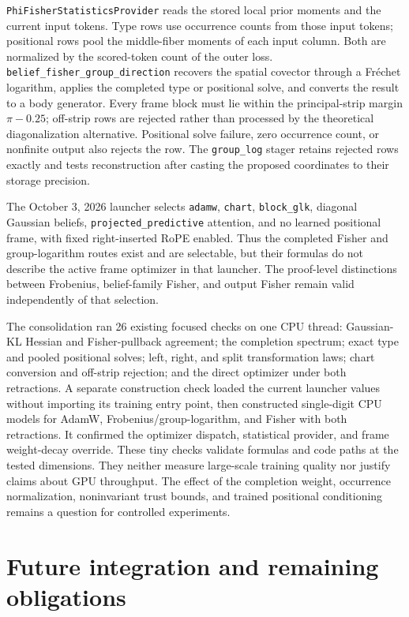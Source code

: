 \documentclass[11pt]{article}
\theoremstyle{definition}
\theoremstyle{remark}
\begin{document}
\texttt{PhiFisherStatisticsProvider} reads the stored local prior moments and the current input tokens. Type rows use occurrence counts from those input tokens; positional rows pool the middle-fiber moments of each input column. Both are normalized by the scored-token count of the outer loss. \texttt{belief\_fisher\_group\_direction} recovers the spatial covector through a Fr\'echet logarithm, applies the completed type or positional solve, and converts the result to a body generator. Every frame block must lie within the principal-strip margin \(\pi-0.25\); off-strip rows are rejected rather than processed by the theoretical diagonalization alternative. Positional solve failure, zero occurrence count, or nonfinite output also rejects the row. The \texttt{group\_log} stager retains rejected rows exactly and tests reconstruction after casting the proposed coordinates to their storage precision.

The October 3, 2026 launcher selects \texttt{adamw}, \texttt{chart}, \texttt{block\_glk}, diagonal Gaussian beliefs, \texttt{projected\_predictive} attention, and no learned positional frame, with fixed right-inserted RoPE enabled. Thus the completed Fisher and group-logarithm routes exist and are selectable, but their formulas do not describe the active frame optimizer in that launcher. The proof-level distinctions between Frobenius, belief-family Fisher, and output Fisher remain valid independently of that selection.

The consolidation ran 26 existing focused checks on one CPU thread: Gaussian-KL Hessian and Fisher-pullback agreement; the completion spectrum; exact type and pooled positional solves; left, right, and split transformation laws; chart conversion and off-strip rejection; and the direct optimizer under both retractions. A separate construction check loaded the current launcher values without importing its training entry point, then constructed single-digit CPU models for AdamW, Frobenius/group-logarithm, and Fisher with both retractions. It confirmed the optimizer dispatch, statistical provider, and frame weight-decay override. These tiny checks validate formulas and code paths at the tested dimensions. They neither measure large-scale training quality nor justify claims about GPU throughput. The effect of the completion weight, occurrence normalization, noninvariant trust bounds, and trained positional conditioning remains a question for controlled experiments.

\section{Future integration and remaining obligations}
\label{unified:integration}
\end{document}
